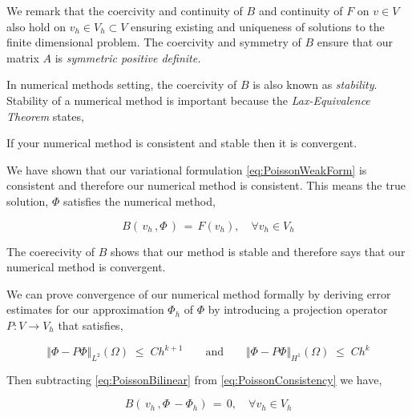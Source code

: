 \documentclass[10pt]{report}
\numberwithin{equation}{section}
\begin{document}
\vspace{5mm}

\noindent
We remark that the coercivity and continuity of $B$ and continuity of $F$ on $v \in V$ also hold on $v_{h} \in V_{h} \subset V$ ensuring existing and uniqueness of solutions to the finite dimensional problem. The coercivity and symmetry of $B$ ensure that our matrix $A$ is \textit{symmetric positive definite.}


In numerical methods setting, the coercivity of $B$ is also known as \textit{stability}.  Stability of a numerical method is important because the \textit{Lax-Equivalence Theorem} states, 

\begin{center}
If your numerical method is consistent and stable then it is convergent.
\end{center}

\noindent
We have shown that our variational formulation \eqref{eq:PoissonWeakForm} is consistent and therefore our numerical method is consistent. This means the true solution, $\Phi$ satisfies the numerical method,

\begin{equation}
\label{eq:PoissonConsistency}
B\left( \, v_{h} \, , \Phi \, \right) \, = \, F(v_{h}), \quad \forall v_{h} \in V_{h}
\end{equation}

The coerecivity of $B$ shows that our method is stable and therefore says that our numerical method is convergent.  

\vspace{2mm}

We can prove convergence of our numerical method  formally by deriving error estimates for our approximation $\Phi_{h}$ of $\Phi$ by introducing a projection operator $P : V \rightarrow V_{h}$ that satisfies,

\begin{equation}
\Vert \Phi - P \Phi \Vert_{L^{2}}(\Omega) \; \leq \; Ch^{k+1}  \qquad \text{and} \qquad 
\Vert \Phi - P \Phi \Vert_{H^{1}}(\Omega) \; \leq \; Ch^{k} \label{eq:ApproxProp}
\end{equation}

\noindent
Then subtracting \eqref{eq:PoissonBilinear} from \eqref{eq:PoissonConsistency} we have,

\begin{equation}
B\left( \, v_{h} \, , \Phi \,  - \Phi_{h} \right) \, = \, 0, \quad \forall v_{h} \in V_{h}
\end{equation}
\end{document}
